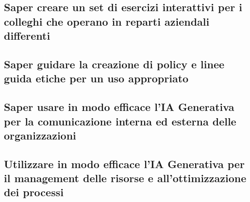     \subsection{Saper creare un set di esercizi interattivi per i colleghi che operano in reparti aziendali differenti}
    \subsection{Saper guidare la creazione di policy e linee guida etiche per un uso appropriato}
    \subsection{Saper usare in modo efficace l’IA Generativa per la comunicazione interna ed esterna delle organizzazioni}
    \subsection{Utilizzare in modo efficace l’IA Generativa per il management delle risorse e all’ottimizzazione dei processi}